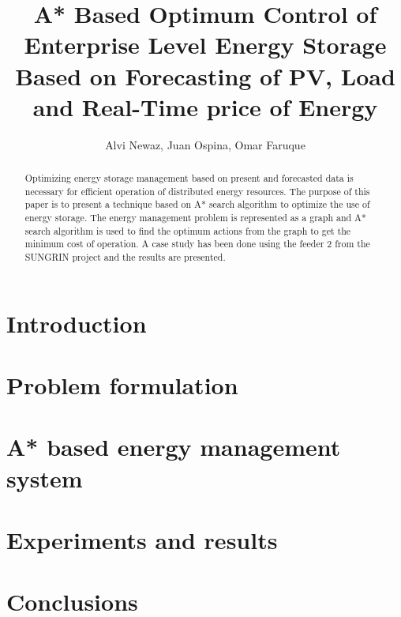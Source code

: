 \documentclass[journal]{IEEEtran}
\begin{document}
\title{A* Based Optimum Control of Enterprise Level Energy Storage Based on Forecasting of PV, Load and Real-Time price of Energy}

\author{Alvi Newaz, Juan Ospina, Omar Faruque}






\maketitle                                                               

\begin{abstract}
Optimizing energy storage management based on present and forecasted data is necessary for efficient operation of distributed energy resources. The purpose of this paper is to present a technique based on A* search algorithm \cite{a8book} to optimize the use of energy storage. The energy management problem is represented as a graph and A* search algorithm is used to find the optimum actions from the graph to get the minimum cost of operation. A case study has been done using the feeder 2 from the SUNGRIN project \cite{SUNGRIN} and the results are presented.


\end{abstract}



\IEEEpeerreviewmaketitle



\section{Introduction}


\section{Problem formulation}


\section{A* based energy management system}




\section{Experiments and results}


\section{Conclusions}




\ifCLASSOPTIONcaptionsoff
  \newpage
\fi
\end{document}
